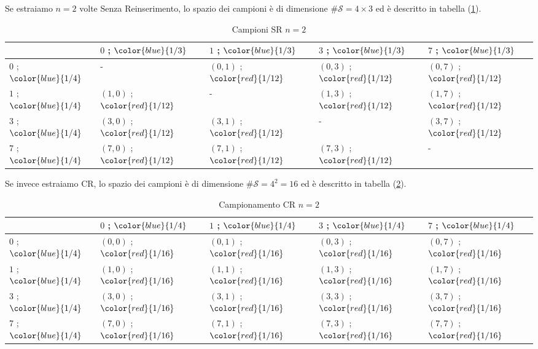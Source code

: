 \documentclass[
  11pt,
]{book}
\theoremstyle{mytheoremstyle}
\theoremstyle{mydefstyle}
\begin{document}
Se estraiamo \(n=2\) volte Senza Reinserimento, lo spazio dei campioni è di dimensione \(\#\mathcal{S}=4\times 3\) ed è descritto in tabella (\ref{tab:csr}).

\begin{table}
\centering
\caption{\label{tab:csr}Campioni SR $n=2$}
\centering
\begin{tabular}[t]{l|l|l|l|l}
\hline
  & $0$ ; $\color{blue}{1/3}$ & $1$ ; $\color{blue}{1/3}$ & $3$ ; $\color{blue}{1/3}$ & $7$ ; $\color{blue}{1/3}$\\
\hline
$0$ ; $\color{blue}{1/4}$ & - & $(0,1)$ ; $\color{red}{1/12}$ & $(0,3)$ ; $\color{red}{1/12}$ & $(0,7)$ ; $\color{red}{1/12}$\\
\hline
$1$ ; $\color{blue}{1/4}$ & $(1,0)$ ; $\color{red}{1/12}$ & - & $(1,3)$ ; $\color{red}{1/12}$ & $(1,7)$ ; $\color{red}{1/12}$\\
\hline
$3$ ; $\color{blue}{1/4}$ & $(3,0)$ ; $\color{red}{1/12}$ & $(3,1)$ ; $\color{red}{1/12}$ & - & $(3,7)$ ; $\color{red}{1/12}$\\
\hline
$7$ ; $\color{blue}{1/4}$ & $(7,0)$ ; $\color{red}{1/12}$ & $(7,1)$ ; $\color{red}{1/12}$ & $(7,3)$ ; $\color{red}{1/12}$ & -\\
\hline
\end{tabular}
\end{table}

Se invece estraiamo CR, lo spazio dei campioni è di dimensione \(\#\mathcal{S}=4^2=16\) ed è descritto in tabella (\ref{tab:ccr}).

\begin{table}
\centering
\caption{\label{tab:ccr}Campionamento CR $n=2$}
\centering
\begin{tabular}[t]{l|l|l|l|l}
\hline
  & $0$ ; $\color{blue}{1/4}$ & $1$ ; $\color{blue}{1/4}$ & $3$ ; $\color{blue}{1/4}$ & $7$ ; $\color{blue}{1/4}$\\
\hline
$0$ ; $\color{blue}{1/4}$ & $(0,0)$ ; $\color{red}{1/16}$ & $(0,1)$ ; $\color{red}{1/16}$ & $(0,3)$ ; $\color{red}{1/16}$ & $(0,7)$ ; $\color{red}{1/16}$\\
\hline
$1$ ; $\color{blue}{1/4}$ & $(1,0)$ ; $\color{red}{1/16}$ & $(1,1)$ ; $\color{red}{1/16}$ & $(1,3)$ ; $\color{red}{1/16}$ & $(1,7)$ ; $\color{red}{1/16}$\\
\hline
$3$ ; $\color{blue}{1/4}$ & $(3,0)$ ; $\color{red}{1/16}$ & $(3,1)$ ; $\color{red}{1/16}$ & $(3,3)$ ; $\color{red}{1/16}$ & $(3,7)$ ; $\color{red}{1/16}$\\
\hline
$7$ ; $\color{blue}{1/4}$ & $(7,0)$ ; $\color{red}{1/16}$ & $(7,1)$ ; $\color{red}{1/16}$ & $(7,3)$ ; $\color{red}{1/16}$ & $(7,7)$ ; $\color{red}{1/16}$\\
\hline
\end{tabular}
\end{table}
\end{document}
